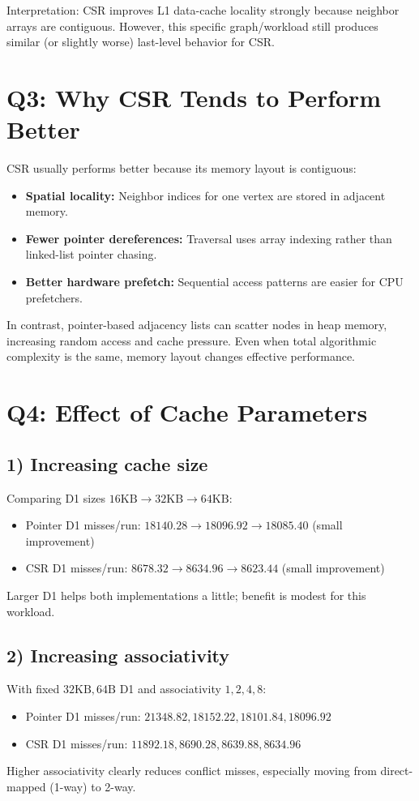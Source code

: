 \documentclass[11pt]{article}
\begin{document}
Interpretation: CSR improves L1 data-cache locality strongly because neighbor arrays are contiguous.
However, this specific graph/workload still produces similar (or slightly worse) last-level behavior for CSR.

\section*{Q3: Why CSR Tends to Perform Better}
CSR usually performs better because its memory layout is contiguous:
\begin{itemize}
\item \textbf{Spatial locality:} Neighbor indices for one vertex are stored in adjacent memory.
\item \textbf{Fewer pointer dereferences:} Traversal uses array indexing rather than linked-list pointer chasing.
\item \textbf{Better hardware prefetch:} Sequential access patterns are easier for CPU prefetchers.
\end{itemize}

In contrast, pointer-based adjacency lists can scatter nodes in heap memory, increasing random access and cache pressure.
Even when total algorithmic complexity is the same, memory layout changes effective performance.

\section*{Q4: Effect of Cache Parameters}
\subsection*{1) Increasing cache size}
Comparing D1 sizes \(16\text{KB} \rightarrow 32\text{KB} \rightarrow 64\text{KB}\):
\begin{itemize}
\item Pointer D1 misses/run: \(18140.28 \rightarrow 18096.92 \rightarrow 18085.40\) (small improvement)
\item CSR D1 misses/run: \(8678.32 \rightarrow 8634.96 \rightarrow 8623.44\) (small improvement)
\end{itemize}
Larger D1 helps both implementations a little; benefit is modest for this workload.

\subsection*{2) Increasing associativity}
With fixed \(32\text{KB}, 64\text{B}\) D1 and associativity \(1,2,4,8\):
\begin{itemize}
\item Pointer D1 misses/run: \(21348.82, 18152.22, 18101.84, 18096.92\)
\item CSR D1 misses/run: \(11892.18, 8690.28, 8639.88, 8634.96\)
\end{itemize}
Higher associativity clearly reduces conflict misses, especially moving from direct-mapped (1-way) to 2-way.
\end{document}
